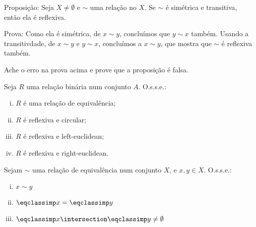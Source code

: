 \begin{exercise}
	Proposição: Seja $X \neq \emptyset$ e $\sim$ uma relação no $X$. Se $\sim$ é simétrica e transitiva, então ela é reflexiva.

	Prova: Como ela é simétrica, de $x \sim y$, concluímos que $y \sim x$ também. Usando a transitivdade, de $x \sim y$ e $y \sim x$, concluímos a $x \sim y$, que mostra que $\sim$ é reflexiva também.

	Ache o erro na prova acima e prove que a proposição é falsa.
\end{exercise}

\begin{exercise}
	Seja $R$ uma relação binária num conjunto $A$. O.s.s.e.:
	\begin{enumerate}[(i)]
		\item $R$ é uma relação de equivalência;
		\item $R$ é reflexiva e circular;
		\item $R$ é reflexiva e left-euclidean;
		\item $R$ é reflexiva e right-euclidean.
	\end{enumerate}
\end{exercise}

\begin{exercise}
	Sejam $\sim$ uma relação de equivalência num conjunto $X$, e $x, y \in X$. O.s.s.e.:
	\begin{enumerate}[(i)]
		\item $x \sim y$
		\item $\eqclassimp x = \eqclassimp y$
		\item $\eqclassimp x \intersection \eqclassimp y \neq \emptyset$
	\end{enumerate}
\end{exercise}
